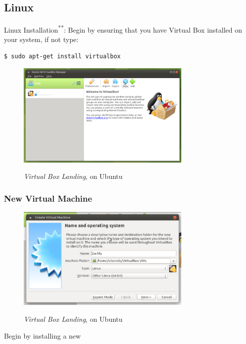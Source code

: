 \subsection{Linux}
\noindent Linux Installation\textsuperscript{**}: Begin by ensuring that you have Virtual Box installed on your system, if not type:
\begin{lstlisting}[language=bash]
    $ sudo apt-get install virtualbox
\end{lstlisting}
\begin{figure}[!htb]
    \centering
    \includegraphics[width=0.752\textwidth]{images/00-0.png}\\[0cm]  
    \caption[Virtual Box]{\emph{Virtual Box Landing}, on Ubuntu}
    \label{fig:00-01 - Linux Virtual Box Landing} 
\end{figure}

\subsubsection{New Virtual Machine}

\begin{figure}[!htb]
    \centering
    \includegraphics[width=0.752\textwidth]{images/00-01.png}\\[0cm]  
    \caption[Virtual Box]{\emph{Virtual Box Landing}, on Ubuntu}
    \label{fig:00-01 - Linux Virtual Box New VM} 
\end{figure}
Begin by installing a new

